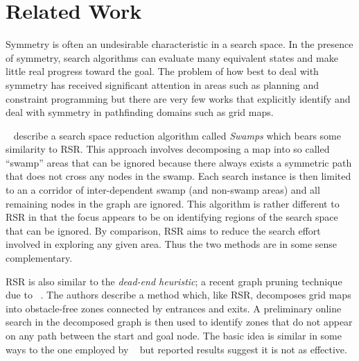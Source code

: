 \section{Related Work}
\label{sec:relatedwork}
Symmetry is often an undesirable characteristic in a search space.
In the presence of symmetry, search algorithms can evaluate many equivalent
states and make little real progress toward the goal.
The problem of how best to deal with symmetry has received significant attention 
in areas such as planning \cite{fox99} and constraint programming \cite{gent00} 
but there are very few works that explicitly identify and deal with symmetry in 
pathfinding domains such as grid maps. 
\par
\citeauthor{pochter10}~ describe a search space
reduction algorithm called \emph{Swamps} which bears some similarity to RSR.
This approach involves decomposing a map into so called ``swamp'' areas that can
be ignored because there always exists a symmetric path that does not cross any
nodes in the swamp. Each search instance is then limited to an a corridor of
inter-dependent swamp (and non-swamp areas) and all remaining nodes in the graph
are ignored. This algorithm is rather different to RSR in that the focus appears
to be on identifying regions of the search space that can be ignored.  
By comparison, RSR aims to reduce the search effort involved in exploring any
given area. Thus the two methods are in some sense complementary.
\par
RSR is also similar to the \emph{dead-end heuristic}; a recent graph pruning
technique due to \citeauthor{bjornsson06}~.
The authors describe a method which, like RSR, decomposes grid maps into
obstacle-free zones connected by entrances and exits.  A preliminary online
search in the decomposed graph is then used to identify zones that do not appear
on any path between the start and goal node.  The basic idea is similar in some
ways to the one employed by \citeauthor{pochter10}~ but
reported results suggest it is not as effective.

